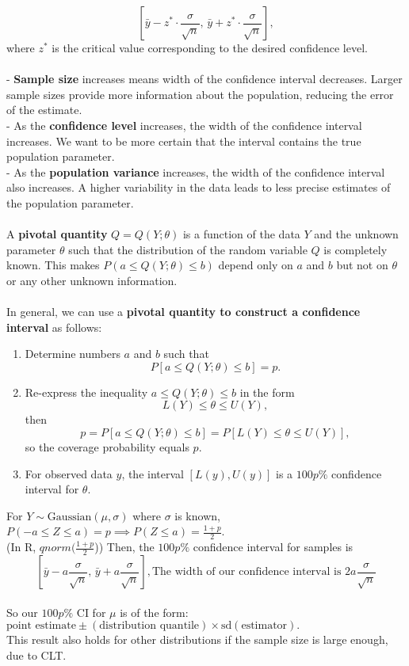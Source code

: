 \documentclass[a4paper,12pt]{article}
\begin{document}
\[
\left[ \bar{y} - z^* \cdot \frac{\sigma}{\sqrt{n}}, \, \bar{y} + z^* \cdot \frac{\sigma}{\sqrt{n}} \right],
\]
where $z^*$ is the critical value corresponding to the desired confidence level.
\\
\\- \textbf{Sample size} increases means width of the confidence interval decreases. Larger sample sizes provide more information about the population, reducing the error of the estimate.
\\- As the \textbf{confidence level} increases, the width of the confidence interval increases. We want to be more certain that the interval contains the true population parameter.
\\- As the \textbf{population variance }increases, the width of the confidence interval also increases. A higher variability in the data leads to less precise estimates of the population parameter.
\\
\\ A \textbf{pivotal quantity} $Q = Q(Y; \theta)$ is a function of the data $Y$ and the unknown parameter $\theta$ such that the distribution of the random variable $Q$ is completely known. This makes $P(a \leq Q(Y; \theta) \leq b)$ 
depend only on $a$ and $b$ but not on $\theta$ or any
other unknown information.
\\
\\ In general, we can use a \textbf{pivotal quantity to construct a confidence interval} as follows:

\begin{enumerate}
    \item Determine numbers $a$ and $b$ such that 
    \[
    P[a \leq Q(Y; \theta) \leq b] = p.
    \]

    \item Re-express the inequality $a \leq Q(Y; \theta) \leq b$ in the form 
    \[
    L(Y) \leq \theta \leq U(Y),
    \] 
    then 
    \[
    p = P[a \leq Q(Y; \theta) \leq b] = P[L(Y) \leq \theta \leq U(Y)],
    \]
    so the coverage probability equals $p$.

    \item For observed data $y$, the interval $[L(y), U(y)]$ is a $100p\%$ confidence interval for $\theta$.
\end{enumerate}

For $Y \sim \text{Gaussian}(\mu, \sigma)$ where $\sigma$ is known, $
P(-a \leq Z \leq a) = p \implies
P(Z \leq a) = \frac{1 + p}{2}$. 
\\(In R, $qnorm(\frac{1 + p}{2}$)) Then, the $100p\%$ confidence interval for samples is 
\[
\left[ \bar{y} - a \frac{\sigma}{\sqrt{n}}, \, \bar{y} + a \frac{\sigma}{\sqrt{n}} \right], \text{The width of our confidence interval is } 2a \frac{\sigma}{\sqrt{n}}
\]
\\ So our $100p\%$ CI for $\mu$ is of the form:
$
\text{point estimate} \pm (\text{distribution quantile}) \times \text{sd}(\text{estimator}).$
\\This result also holds for other distributions if the sample size is large enough, due to CLT.
\end{document}
